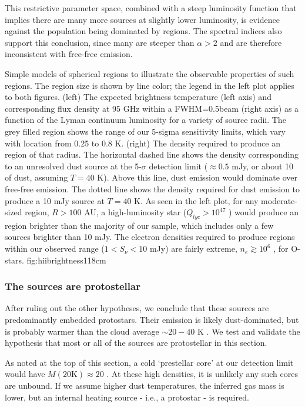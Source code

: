 \documentclass[twocolumn]{aastex61}
\begin{document}
This restrictive parameter space, combined with a steep luminosity function
that implies there are many more sources at slightly lower luminosity, is
evidence against the population being dominated by \hii regions.  The spectral
indices also support this conclusion, since many are steeper than $\alpha>2$
and are therefore inconsistent with free-free emission.



{Simple models of spherical \hii regions to illustrate the observable
properties of such regions.  The \hii region size is shown by line color; the
legend in the left plot applies to both figures.  (left) The expected
brightness temperature (left axis) and corresponding flux density at 95 GHz
within a FWHM=0.5\arcsec beam (right axis) as a function of the Lyman continuum
luminosity for a variety of source radii.  The grey filled region shows the
range of our 5-sigma sensitivity limits,
which vary with location from 0.25 to 0.8 K.
(right) The density required to produce an \hii region of that radius.  The
horizontal dashed line shows the density corresponding to an unresolved dust
source at the 5-$\sigma$ detection limit ($\approx0.5$ mJy, or about 10 \msun
of dust,
assuming $T=40$ K).  Above this line, dust emission would dominate over
free-free emission.  The dotted line shows the density required for dust
emission to produce a 10 mJy source at $T=40$ K.  
As seen in the left plot, for any moderate-sized \hii region, $R>100$ AU, a high-luminosity
star ($Q_{lyc} > 10^{47}$ \pers) would produce an \hii region brighter than the
majority of our sample, which includes only a few sources brighter than 10 mJy.
The electron densities required to produce \hii regions within our observed range
($1<S_\nu<10$ mJy) are fairly extreme, $n_e\gtrsim10^6$ \percc, for O-stars.}
{fig:hiibrightness}{1}{18cm}


\subsubsection{The sources are protostellar}
\label{sec:theyareprotostars}
After ruling out the other hypotheses, we conclude that these sources are
predominantly embedded protostars.  Their emission is likely dust-dominated,
but is probably warmer than the cloud average $\sim20-40$ K
\citep[e.g.,]{Ginsburg2016a}.  We test and validate the hypothesis that most or
all of the sources are protostellar in this section.

As noted at the top of this section, a cold `prestellar core' at our detection
limit would have $M(20\mathrm{K})\approx20$ \msun.  At these high densities, it
is unlikely any such cores are unbound.  If we assume higher dust temperatures,
the inferred gas mass is lower, but an internal heating source - i.e., a
protostar - is required.
\end{document}

